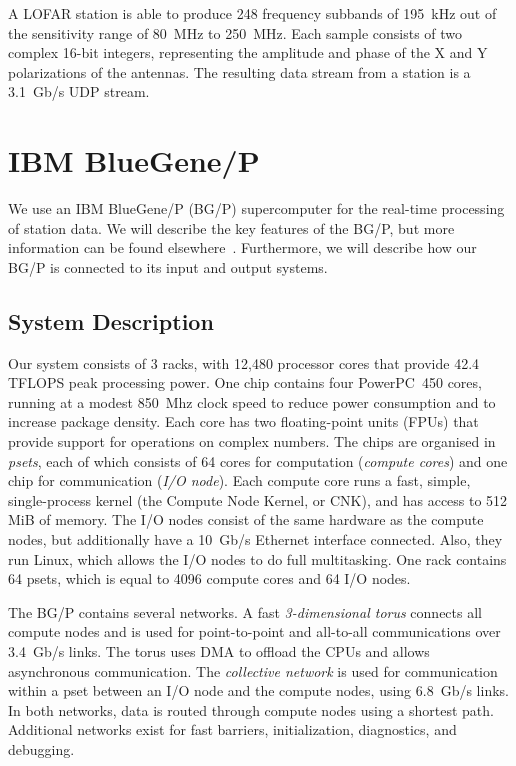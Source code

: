 \documentclass{llncs}
\begin{document}
A LOFAR station is able to produce 248 frequency subbands of 195~kHz out of the sensitivity range of 80~MHz to 250~MHz. Each sample consists of two complex 16-bit integers, representing the amplitude and phase of the X and Y polarizations of the antennas. The resulting data stream from a station is a 3.1~Gb/s UDP stream.


\section{IBM BlueGene/P}

We use an IBM BlueGene/P (BG/P) supercomputer for the real-time processing of station data. We will describe the key features of the BG/P, but more information can be found elsewhere~\cite{IBM:08}. Furthermore, we will describe how our BG/P is connected to its input and output systems.

\subsection{System Description}

Our system consists of 3 racks, with 12,480 processor cores that provide 42.4 TFLOPS peak processing power. One chip contains four PowerPC~450 cores, running at a modest 850~Mhz clock speed to reduce power consumption and to increase package density. Each core has two floating-point units (FPUs) that provide support for operations on complex numbers. The chips are organised in \emph{psets}, each of which consists of 64 cores for computation (\emph{compute cores}) and one chip for communication (\emph{I/O node}). Each compute core runs a fast, simple, single-process kernel (the Compute Node Kernel, or CNK), and has access to 512 MiB of memory. The I/O nodes consist of the same hardware as the compute nodes, but additionally have a 10~Gb/s Ethernet interface connected. Also, they run Linux, which allows the I/O nodes to do full multitasking. One rack contains 64 psets, which is equal to 4096 compute cores and 64 I/O nodes.

The BG/P contains several networks. A fast \emph{3-dimensional torus\/} connects all compute nodes and is used for point-to-point and all-to-all communications over 3.4~Gb/s links. The torus uses DMA to offload the CPUs and allows asynchronous communication. The \emph{collective network\/} is used for communication within a pset between an I/O node and the compute nodes, using 6.8~Gb/s links. In both networks, data is routed through compute nodes using a shortest path. Additional networks exist for fast barriers, initialization, diagnostics, and debugging.
\end{document}
